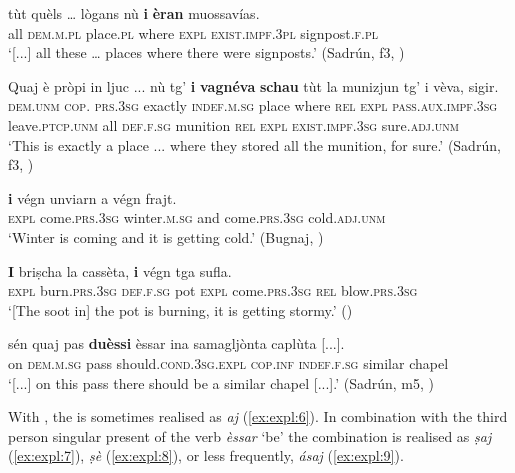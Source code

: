  \ea\label{ex:expl:1}
 \gll [...] tùt quèls … lògans nù \textbf{i} \textbf{èran} muossavías.   \\
 {} all \textsc{dem.m.pl} {} place.\textsc{pl} where \textsc{expl} \textsc{exist.impf.3pl} signpost.\textsc{f.pl}\\
\glt `[...] all these … places where there were signposts.' (Sadrún, f3, )
 \z
 
\ea\label{ex:expl:2}
 \gll  Quaj è pròpi in ljuc ... nù tg’ \textbf{i} \textbf{vagnéva} \textbf{schau} tùt la munizjun tg’ i vèva, sigir.\\
 \textsc{dem.unm} \textsc{cop. prs.3sg} exactly \textsc{indef.m.sg} place {} where \textsc{rel} \textsc{expl} \textsc{pass.aux.impf.3sg} leave.\textsc{ptcp.unm} all \textsc{def.f.sg} munition \textsc{rel} \textsc{expl} \textsc{exist.impf.3sg} sure.\textsc{adj.unm}\\
\glt `This is exactly a place ... where they stored all the munition, for sure.' (Sadrún, f3, )
\z
 
\ea\label{ex:expl:3}
\gll […] \textbf{i} végn unviarn a végn frajt. \\
     {} \textsc{expl} come.\textsc{prs.3sg} winter.\textsc{m.sg} and come.\textsc{prs.3sg} cold.\textsc{adj.unm} \\
\glt `Winter is coming and it is getting cold.' (Bugnaj, \citealt[145]{Büchli1966})
\z

\ea\label{ex:expl:4}
\gll \textbf{I} briṣcha la cassèta, \textbf{i} végn tga sufla. \\
   \textsc{expl} burn.\textsc{prs.3sg} \textsc{def.f.sg} pot \textsc{expl} come.\textsc{prs.3sg} \textsc{rel} blow.\textsc{prs.3sg} \\
\glt `[The soot in] the pot is burning, it is getting stormy.' ()
\z

\ea\label{ex:expl:5}
\gll  [...] sén quaj pas \textbf{duèssi} èssar ina samagljònta caplùta [...].\\
{} on \textsc{dem.m.sg} pass should.\textsc{cond.3sg.expl} \textsc{cop.inf} \textsc{indef.f.sg} similar chapel\\
\glt `[...] on this pass there should be a similar chapel [...].' (Sadrún, m5, )
\z

With , the  is sometimes realised as \textit{aj} (\ref{ex:expl:6}). In combination with the third person singular present of the verb \textit{èssar} `be' the combination is realised as \textit{ṣaj} (\ref{ex:expl:7}), \textit{ṣè} (\ref{ex:expl:8}), or less frequently, \textit{ásaj} (\ref{ex:expl:9}).

